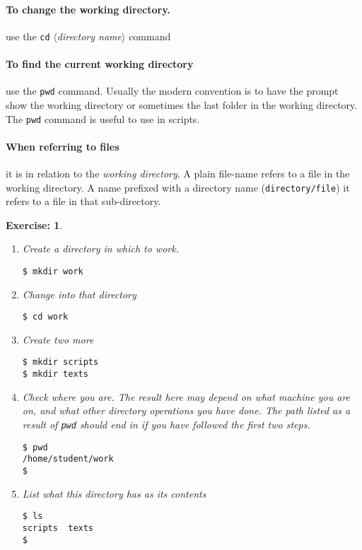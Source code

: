 \documentclass[12pt,a4paper]{article}
\newtheorem{exercise}{Exercise:}
\begin{document}
\paragraph{To change the working directory.}  use the \texttt{cd}
$\langle$\emph{directory name}$\rangle$ command

\paragraph{To find the current working directory} use the \texttt{pwd} command.
Usually the modern convention is to have the prompt show the working directory
or sometimes the last folder in the working directory.  The \texttt{pwd}
command is useful to use in scripts.

\paragraph{When referring to files} it is in relation to the \emph{working
directory}.  A plain file-name refers to a file in the working
directory.  A name prefixed with a directory name (\texttt{directory/file}) it
refers to a file in that sub-directory.

\begin{exercise}~\\[-1em]
\begin{enumerate}
\item {Create a directory} in which to work.
\begin{code}
\begin{verbatim}
$ mkdir work
\end{verbatim}
\end{code}
\item Change into that directory
	\begin{code}
\begin{verbatim}
$ cd work
\end{verbatim}
	\end{code}
\item Create two more
	\begin{code}
\begin{verbatim}
$ mkdir scripts
$ mkdir texts
\end{verbatim}
	\end{code}
\item Check where you are.   The result here may depend on what machine you are
	on, and what other directory operations you have done.  The path listed as
	a result of \verb'pwd' should end in  if you have followed the
	first two steps.
	\begin{code}
\begin{verbatim}
$ pwd
/home/student/work
$
\end{verbatim}
	\end{code}
\item List what this directory has as its contents
	\begin{code}
\begin{verbatim}
$ ls
scripts  texts
$
\end{verbatim}
	\end{code}
\end{enumerate}
\end{exercise}
\end{document}
